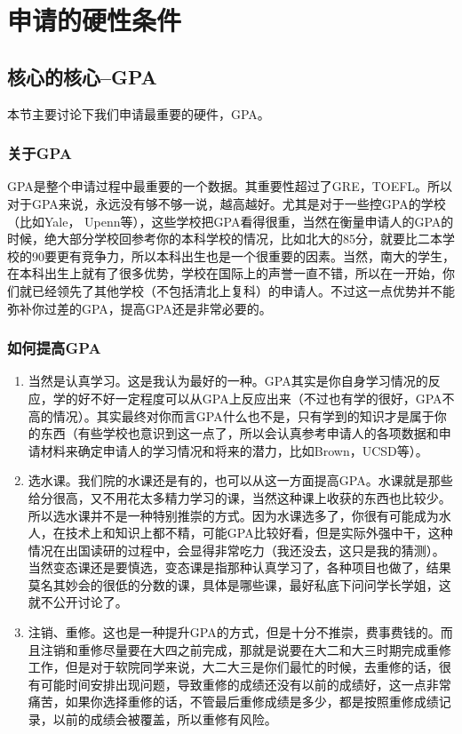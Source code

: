 \chapter{申请的硬性条件}
\newpage
\section{核心的核心--GPA}
本节主要讨论下我们申请最重要的硬件，GPA。
\subsection{关于GPA}

GPA是整个申请过程中最重要的一个数据。其重要性超过了GRE，TOEFL。所以对于GPA来说，永远没有够不够一说，越高越好。尤其是对于一些控GPA的学校（比如Yale， Upenn等），这些学校把GPA看得很重，当然在衡量申请人的GPA的时候，绝大部分学校回参考你的本科学校的情况，比如北大的85分，就要比二本学校的90要更有竞争力，所以本科出生也是一个很重要的因素。当然，南大的学生，在本科出生上就有了很多优势，学校在国际上的声誉一直不错，所以在一开始，你们就已经领先了其他学校（不包括清北上复科）的申请人。不过这一点优势并不能弥补你过差的GPA，提高GPA还是非常必要的。

\subsection{如何提高GPA}
\begin{enumerate}
\item 当然是认真学习。这是我认为最好的一种。GPA其实是你自身学习情况的反应，学的好不好一定程度可以从GPA上反应出来（不过也有学的很好，GPA不高的情况）。其实最终对你而言GPA什么也不是，只有学到的知识才是属于你的东西（有些学校也意识到这一点了，所以会认真参考申请人的各项数据和申请材料来确定申请人的学习情况和将来的潜力，比如Brown，UCSD等）。

\item 选水课。我们院的水课还是有的，也可以从这一方面提高GPA。水课就是那些给分很高，又不用花太多精力学习的课，当然这种课上收获的东西也比较少。所以选水课并不是一种特别推崇的方式。因为水课选多了，你很有可能成为水人，在技术上和知识上都不精，可能GPA比较好看，但是实际外强中干，这种情况在出国读研的过程中，会显得非常吃力（我还没去，这只是我的猜测）。当然变态课还是要慎选，变态课是指那种认真学习了，各种项目也做了，结果莫名其妙会的很低的分数的课，具体是哪些课，最好私底下问问学长学姐，这就不公开讨论了。

\item 注销、重修。这也是一种提升GPA的方式，但是十分不推崇，费事费钱的。而且注销和重修尽量要在大四之前完成，那就是说要在大二和大三时期完成重修工作，但是对于软院同学来说，大二大三是你们最忙的时候，去重修的话，很有可能时间安排出现问题，导致重修的成绩还没有以前的成绩好，这一点非常痛苦，如果你选择重修的话，不管最后重修成绩是多少，都是按照重修成绩记录，以前的成绩会被覆盖，所以重修有风险。
\end{enumerate}

